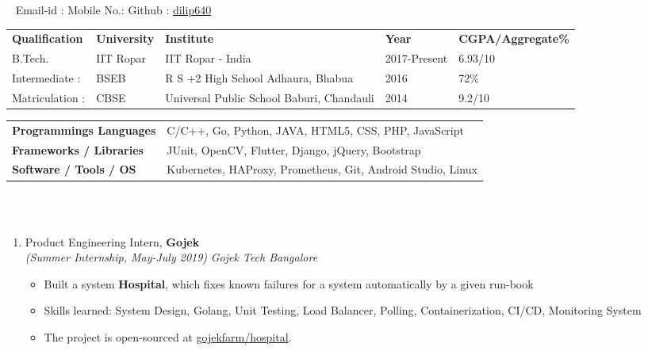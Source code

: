\documentclass[a4paper,10pt]{awesome}
\newcommand{\psep}{-0.6cm}
\begin{document}
\ \linebreak
{} \hfill Email-id :  \linebreak
{} \hfill Mobile No.:  \linebreak
{} \hfill Github : \href{https://github.com/dilip640}{dilip640}
\linebreak \linebreak
{}

\begin{tabular}{ l @{\hskip 0.12in} l @{\hskip 0.12in} l @{\hskip 0.12in} l @{\hskip 0.12in} l }

\textbf{Qualification} & \textbf{University} & \textbf{Institute} & \textbf{Year} & \textbf{CGPA/Aggregate\%} \\

B.Tech.& IIT Ropar & IIT Ropar  - India & 2017-Present & 6.93/10 \\
Intermediate :& BSEB & R S +2 High School Adhaura, Bhabua & 2016  &  72\% \\
Matriculation :& CBSE & Universal Public School Baburi, Chandauli  & 2014& 9.2/10 \\
\end{tabular} \linebreak
{}\linebreak
\indent 
\begin{tabular}{ l @{\hskip 0.006cm} l }
    \textbf{Programmings Languages } & C/C++, Go, Python, JAVA, HTML5, CSS, PHP, JavaScript \\
    \textbf{Frameworks / Libraries} & JUnit, OpenCV, Flutter, Django, jQuery, Bootstrap \\ 
    \textbf{Software / Tools / OS} & Kubernetes, HAProxy, Prometheus, Git, Android Studio, Linux  \\
\end{tabular}\\
\linebreak
{}\\[\psep]
\begin{enumerate}
\item[] Product Engineering Intern, \textbf{Gojek}\\
    \emph{(Summer Internship, May-July 2019)} \hfill  \emph{Gojek Tech Bangalore}\\[-0.6cm]
    \begin{itemize}
        \item Built a system \textbf{Hospital}, which fixes known failures for a system 
            automatically by a given run-book
        \item Skills learned: System Design, Golang, Unit Testing, Load Balancer, Polling, 
            Containerization, CI/CD, Monitoring System
        \item The project is open-sourced at \href{https://github.com/gojekfarm/hospital}{gojekfarm/hospital}.
    \end{itemize}
\end{enumerate}
\end{document}

